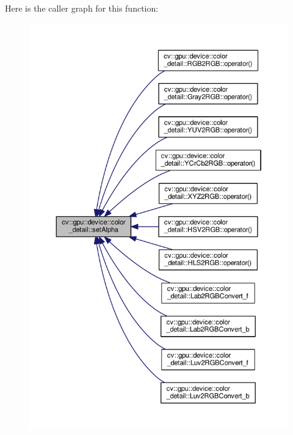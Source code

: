 Here is the caller graph for this function\-:\nopagebreak
\begin{figure}[H]
\begin{center}
\leavevmode
\includegraphics[width=350pt]{namespacecv_1_1gpu_1_1device_1_1color__detail_acb9d96dfb22d9acc884180ee4ee8dd65_icgraph}
\end{center}
\end{figure}


